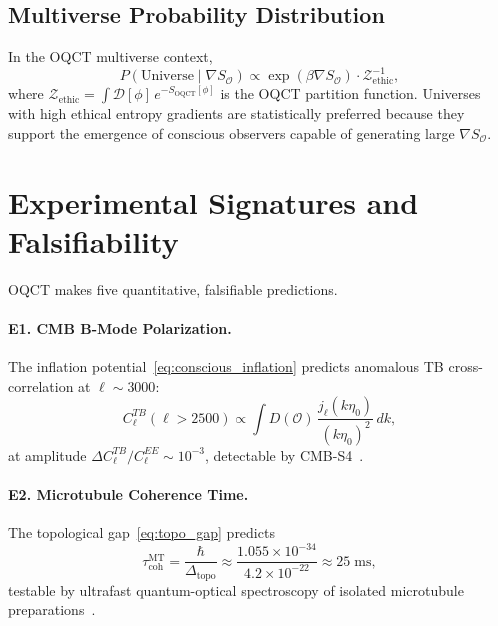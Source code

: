 \documentclass[12pt,a4paper]{article}
\theoremstyle{myrmk}
\newcommand{\SO}{\nabla S_{\!\mathcal{O}}}
\begin{document}
\subsection{Multiverse Probability Distribution}

In the OQCT multiverse context,
\begin{equation}
  P(\text{Universe}\mid\SO)
  \propto \exp(\beta\SO)\cdot\mathcal{Z}_{\mathrm{ethic}}^{-1},
  \label{eq:multiverse_prob}
\end{equation}
where $\mathcal{Z}_{\mathrm{ethic}}=\int\mathcal{D}[\phi]\,e^{-S_{\mathrm{OQCT}}[\phi]}$
is the OQCT partition function. Universes with high ethical entropy gradients are
statistically preferred because they support the emergence of conscious observers
capable of generating large $\SO$.

\section{Experimental Signatures and Falsifiability}
\label{sec:experiment}

OQCT makes five quantitative, falsifiable predictions.

\paragraph{E1. CMB B-Mode Polarization.}
The inflation potential~\eqref{eq:conscious_inflation} predicts anomalous TB
cross-correlation at $\ell\sim3000$:
\begin{equation}
  C^{TB}_\ell(\ell>2500)\propto\int D(\mathcal{O})\,\frac{j_\ell(k\eta_0)}{(k\eta_0)^2}\,dk,
\end{equation}
at amplitude $\Delta C_\ell^{TB}/C_\ell^{EE}\sim10^{-3}$, detectable by CMB-S4~\cite{CMBS4}.

\paragraph{E2. Microtubule Coherence Time.}
The topological gap~\eqref{eq:topo_gap} predicts
\begin{equation}
  \tau_{\mathrm{coh}}^{\mathrm{MT}}=\frac{\hbar}{\Delta_{\mathrm{topo}}}
  \approx\frac{1.055\times10^{-34}}{4.2\times10^{-22}}\approx25\;\mathrm{ms},
\end{equation}
testable by ultrafast quantum-optical spectroscopy of isolated microtubule
preparations~\cite{Engel2007}.
\end{document}
